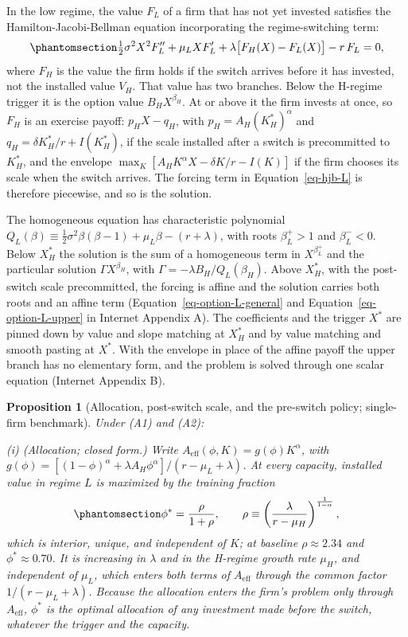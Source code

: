 \documentclass[
  11pt,
  letterpaper,
]{scrartcl}
\begin{document}
In the low regime, the value \(F_L\) of a firm that has not yet invested
satisfies the Hamilton-Jacobi-Bellman equation incorporating the
regime-switching term:
\begin{equation}\protect\phantomsection\label{eq-hjb-L}{
\tfrac{1}{2}\sigma^2 X^2 F_L'' + \mu_L X F_L' + \lambda\bigl[F_H(X) - F_L(X)\bigr] - r\, F_L = 0,
}\end{equation} where \(F_H\) is the value the firm holds if the switch
arrives before it has invested, not the installed value \(V_H\). That
value has two branches. Below the H-regime trigger it is the option
value \(B_H X^{\beta_H}\). At or above it the firm invests at once, so
\(F_H\) is an exercise payoff: \(p_H X - q_H\), with
\(p_H = A_H (K_H^*)^\alpha\) and \(q_H = \delta K_H^*/r + I(K_H^*)\), if
the scale installed after a switch is precommitted to \(K_H^*\), and the
envelope \(\max_K [A_H K^\alpha X - \delta K/r - I(K)]\) if the firm
chooses its scale when the switch arrives. The forcing term in
Equation~\ref{eq-hjb-L} is therefore piecewise, and so is the solution.

The homogeneous equation has characteristic polynomial
\(Q_L(\beta) \equiv \tfrac{1}{2}\sigma^2 \beta(\beta - 1) + \mu_L \beta - (r + \lambda)\),
with roots \(\beta_L^+ > 1\) and \(\beta_L^- < 0\). Below \(X_H^*\) the
solution is the sum of a homogeneous term in \(X^{\beta_L^+}\) and the
particular solution \(\Gamma X^{\beta_H}\), with
\(\Gamma = -\lambda B_H/Q_L(\beta_H)\). Above \(X_H^*\), with the
post-switch scale precommitted, the forcing is affine and the solution
carries both roots and an affine term
(Equation~\ref{eq-option-L-general} and Equation~\ref{eq-option-L-upper}
in Internet Appendix A). The coefficients and the trigger \(X^*\) are
pinned down by value and slope matching at \(X_H^*\) and by value
matching and smooth pasting at \(X^*\). With the envelope in place of
the affine payoff the upper branch has no elementary form, and the
problem is solved through one scalar equation (Internet Appendix B).

\textbf{Proposition 1} (Allocation, post-switch scale, and the
pre-switch policy; single-firm benchmark). \emph{Under (A1) and (A2):}

\emph{(i) (Allocation; closed form.) Write
\(A_{\text{eff}}(\phi, K) = g(\phi) K^\alpha\), with
\(g(\phi) = [(1-\phi)^\alpha + \lambda A_H \phi^\alpha]/(r - \mu_L + \lambda)\).
At every capacity, installed value in regime \(L\) is maximized by the
training fraction}
\begin{equation}\protect\phantomsection\label{eq-phi-star}{
\phi^* = \frac{\rho}{1 + \rho}, \qquad \rho \equiv \left(\frac{\lambda}{r - \mu_H}\right)^{\frac{1}{1-\alpha}},
}\end{equation} \emph{which is interior, unique, and independent of
\(K\); at baseline \(\rho \approx 2.34\) and \(\phi^* \approx 0.70\). It
is increasing in \(\lambda\) and in the H-regime growth rate \(\mu_H\),
and independent of \(\mu_L\), which enters both terms of
\(A_{\text{eff}}\) through the common factor
\(1/(r - \mu_L + \lambda)\). Because the allocation enters the firm's
problem only through \(A_{\text{eff}}\), \(\phi^*\) is the optimal
allocation of any investment made before the switch, whatever the
trigger and the capacity.}
\end{document}
